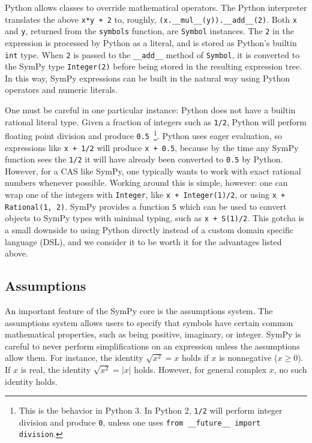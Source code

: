 Python allows classes to override mathematical operators. The Python
interpreter translates the above \texttt{x*y + 2} to, roughly,
\verb|(x.__mul__(y)).__add__(2)|. Both \texttt{x} and \texttt{y}, returned
from the \texttt{symbols} function, are \texttt{Symbol} instances. The
\texttt{2} in the expression is processed by Python as a literal, and is
stored as Python's builtin \texttt{int} type. When \texttt{2} is passed to the
\verb|__add__| method of \texttt{Symbol}, it is converted to the SymPy type
\verb|Integer(2)| before being stored in the resulting expression tree. In
this way, SymPy expressions can be built in the natural way using Python
operators and numeric literals.

One must be careful in one particular instance: Python does not have a builtin
rational literal type. Given a fraction of integers such as \texttt{1/2},
Python will perform floating point division and produce
\texttt{0.5}~\footnote{This is the behavior in Python 3. In Python 2,
  \texttt{1/2} will perform integer division and produce \texttt{0}, unless
  one uses \texttt{from \_\_future\_\_ import division}.}. Python uses eager
evaluation, so expressions like \texttt{x + 1/2} will produce \texttt{x +
  0.5}, because by the time any SymPy function sees the \texttt{1/2} it will
have already been converted to \texttt{0.5} by Python. However, for a CAS like
SymPy, one typically wants to work with exact rational numbers whenever
possible. Working around this is simple, however: one can wrap one of the
integers with \texttt{Integer}, like \verb|x + Integer(1)/2|, or using
\verb|x + Rational(1, 2)|. SymPy provides a function \texttt{S} which can be
used to convert objects to SymPy types with minimal typing, such as
\verb|x + S(1)/2|. This gotcha is a small downside to using Python directly
instead of a custom domain specific language (DSL), and we consider it to be
worth it for the advantages listed above.

\subsection{Assumptions}

An important feature of the SymPy core is the assumptions system. The
assumptions system allows users to specify that symbols have certain common
mathematical properties, such as being positive, imaginary, or integer. SymPy
is careful to never perform simplifications on an expression unless the
assumptions allow them. For instance, the identity $\sqrt{x^2} = x$ holds if
$x$ is nonnegative ($x\ge 0$). If $x$ is real, the identity $\sqrt{x^2}=|x|$
holds. However, for general complex $x$, no such identity holds.

